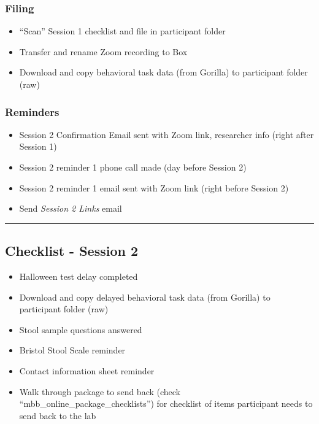 \documentclass[]{book}
\providecommand{\tightlist}{%
  \setlength{\itemsep}{0pt}\setlength{\parskip}{0pt}}
\begin{document}
\hypertarget{filing}{%
\subsubsection{Filing}\label{filing}}

\begin{itemize}
\tightlist
\item
  ``Scan'' Session 1 checklist and file in participant folder
\item
  Transfer and rename Zoom recording to Box
\item
  Download and copy behavioral task data (from Gorilla) to participant folder (raw)
\end{itemize}

\hypertarget{reminders}{%
\subsubsection{Reminders}\label{reminders}}

\begin{itemize}
\tightlist
\item
  Session 2 Confirmation Email sent with Zoom link, researcher info (right after Session 1)
\item
  Session 2 reminder 1 phone call made (day before Session 2)
\item
  Session 2 reminder 1 email sent with Zoom link (right before Session 2)
\item
  Send \emph{Session 2 Links} email
\end{itemize}

\begin{center}\rule{0.5\linewidth}{0.5pt}\end{center}

\hypertarget{checklist---session-2}{%
\subsection{Checklist - Session 2}\label{checklist---session-2}}

\begin{itemize}
\tightlist
\item
  Halloween test delay completed
\item
  Download and copy delayed behavioral task data (from Gorilla) to participant folder (raw)
\item
  Stool sample questions answered
\item
  Bristol Stool Scale reminder
\item
  Contact information sheet reminder
\item
  Walk through package to send back (check ``mbb\_online\_package\_checklists'') for checklist of items participant needs to send back to the lab
\end{itemize}
\end{document}
